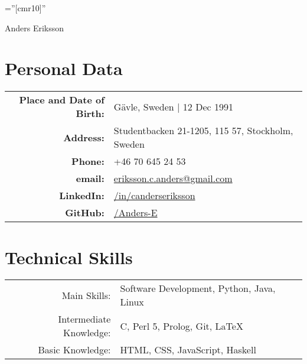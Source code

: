 \documentclass[a4paper,10pt]{article}
\begin{document}
\pagestyle{empty} %

\font\fb=''[cmr10]'' %

\par{\centering
		{\Huge Anders Eriksson
	}\bigskip\par}

\section{Personal Data}

\begin{tabular}{rl}
    \textbf{Place and Date of Birth:} & G{\"a}vle, Sweden  | 12 Dec 1991 \\
    \textbf{Address:}   & Studentbacken 21-1205, 115 57, Stockholm, Sweden \\
    \textbf{Phone:}     & +46 70 645 24 53\\
    \textbf{email:}     & \href{mailto:eriksson.c.anders@gmail.com
}{eriksson.c.anders@gmail.com}\\
    \textbf{LinkedIn:}	& \href{http://se.linkedin.com/in/canderseriksson}{/in/canderseriksson}\\
    \textbf{GitHub:}	& \href{http://github.com/Anders-E}{/Anders-E}
\end{tabular}

\section{Technical Skills}
\begin{tabular}{rl}
Main Skills:& Software Development, Python, Java, Linux \\
Intermediate Knowledge:& C, Perl 5, Prolog, Git, \LaTeX\\
Basic Knowledge:& HTML, CSS, JavaScript, Haskell \\
\end{tabular}
\end{document}
